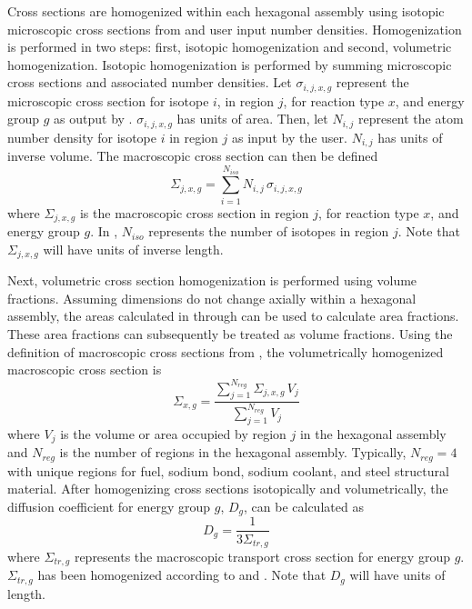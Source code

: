   Cross sections are homogenized within each hexagonal assembly using isotopic
  microscopic cross sections from \mcc and user input number densities.
  Homogenization is performed in two steps: first, isotopic homogenization and
  second, volumetric homogenization. Isotopic homogenization is performed by
  summing microscopic cross sections and associated number densities. Let
  $\sigma_{i,j,x,g}$ represent the microscopic cross section for isotope $i$, in
  region $j$, for reaction type $x$, and energy group $g$ as output by \mcc.
  $\sigma_{i,j,x,g}$ has units of area. Then, let $N_{i,j}$ represent the atom
  number density for isotope $i$ in region $j$ as input by the user. $N_{i,j}$
  has units of inverse volume. The macroscopic cross section can then be
  defined
  \begin{equation}
    \label{eq:isotopic_homogenization}
    \Sigma_{j,x,g} = \sum_{i=1}^{N_{iso}} N_{i,j} \, \sigma_{i,j,x,g}
  \end{equation}
  where $\Sigma_{j,x,g}$ is the macroscopic cross section in region $j$, for
  reaction type $x$, and energy group $g$. In ,
  $N_{iso}$ represents the number of isotopes in region $j$. Note that
  $\Sigma_{j,x,g}$ will have units of inverse length.

  Next, volumetric cross section homogenization is performed using volume
  fractions. Assuming dimensions do not change axially within a hexagonal
  assembly, the areas calculated in  through
   can be used to calculate area fractions.
  These area fractions can subsequently be treated as volume fractions.
  Using the definition of macroscopic cross sections from
  , the volumetrically homogenized macroscopic
  cross section is 
  \begin{equation}
    \label{eq:volumetric_homogenization}
    \Sigma_{x,g} = \frac{\sum_{j = 1}^{N_{reg}} \Sigma_{j,x,g} \, V_j}
      {\sum_{j=1}^{N_{reg}} V_j}
  \end{equation}
  where $V_j$ is the volume or area occupied by region $j$ in the hexagonal
  assembly and $N_{reg}$ is the number of regions in the hexagonal assembly.
  Typically, $N_{reg} = 4$ with unique regions for fuel, sodium bond, sodium
  coolant, and steel structural material. After homogenizing cross sections
  isotopically and volumetrically, the diffusion coefficient for energy group
  $g$, $D_g$, can be calculated as 
  \begin{equation}
    \label{eq:diffusion_homogenization}
    D_g = \frac{1}{3 \Sigma_{tr,g}}
  \end{equation}
  where $\Sigma_{tr,g}$ represents the macroscopic transport cross section for
  energy group $g$. $\Sigma_{tr,g}$ has been homogenized according to
   and .
  Note that $D_g$ will have units of length.

